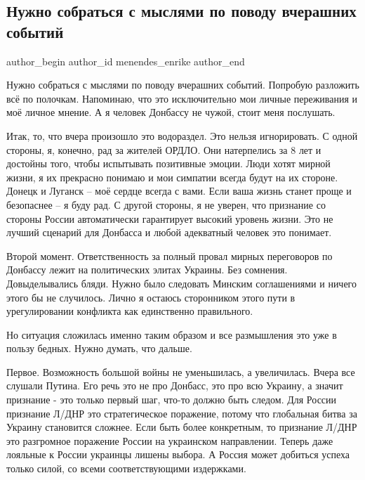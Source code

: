  
 
 
 
 
 
\subsection{Нужно собраться с мыслями по поводу вчерашних событий}
\label{sec:22_02_2022.fb.menendes_enrike.1.sobratsja_s_mysljami}
 
\ifcmt
 author_begin
   author_id menendes_enrike
 author_end
\fi

Нужно собраться с мыслями по поводу вчерашних событий. Попробую разложить всё
по полочкам. Напоминаю, что это исключительно мои личные переживания и моё
личное мнение. А я человек Донбассу не чужой, стоит меня послушать.

Итак, то, что вчера произошло это водораздел. Это нельзя игнорировать. С одной
стороны, я, конечно, рад за жителей ОРДЛО. Они натерпелись за 8 лет и достойны
того, чтобы испытывать позитивные эмоции. Люди хотят мирной жизни, я их
прекрасно понимаю и мои симпатии всегда будут на их стороне. Донецк и Луганск –
моё сердце всегда с вами. Если ваша жизнь станет проще и безопаснее – я буду
рад. С другой стороны, я не уверен, что признание со стороны России
автоматически гарантирует высокий уровень жизни. Это не лучший сценарий для
Донбасса и любой адекватный человек это понимает.

Второй момент. Ответственность за полный провал мирных переговоров по Донбассу
лежит на политических элитах Украины. Без сомнения. Довыделывались бляди. Нужно
было следовать Минским соглашениями и ничего этого бы не случилось. Лично я
остаюсь сторонником этого пути в урегулировании конфликта как единственно
правильного.

Но ситуация сложилась именно таким образом и все размышления это уже в пользу
бедных. Нужно думать, что дальше.

Первое. Возможность большой войны не уменьшилась, а увеличилась. Вчера все
слушали Путина. Его речь это не про Донбасс, это про всю Украину, а значит
признание - это только первый шаг, что-то должно быть следом. Для России
признание Л/ДНР это стратегическое поражение, потому что глобальная битва за
Украину становится сложнее. Если быть более конкретным, то признание Л/ДНР это
разгромное поражение России на украинском направлении. Теперь даже лояльные к
России украинцы лишены выбора. А Россия может добиться успеха только силой, со
всеми соответствующими издержками.

